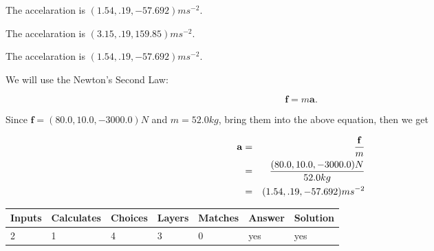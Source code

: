 \documentclass[12pt]{article}
\begin{document}
 
  The accelaration is $  %
(
1.54,
.19,
-57.692)
ms^{-2} $.
 
 
  The accelaration is $  %
(
3.15,
.19,
159.85)
ms^{-2} $.
 
 
\noindent{}
 
 
  The accelaration is $  %
(
1.54,
.19,
-57.692)
ms^{-2} $.
 
 
\noindent{}
 
 
 
 
 
\noindent{}
 
 

We will use the Newton's Second Law:
 
\[
\mathbf{f}=m\mathbf{a}.
\]
 
Since $\mathbf{f}= %
(80.0 , 10.0 , -3000.0) N$
and $m= %
52.0kg$, bring them into the above equation, then we get
 
\begin{eqnarray*}
\mathbf{a}&=&\frac{\mathbf{f}}m  \\
&=&\frac{ %
(80.0 , 10.0 , -3000.0) N}{ %
52.0kg}  \\
&=& %
(1.54 , .19 , -57.692) ms^{-2}
\end{eqnarray*}
 
 
 
\noindent{}
 
 

 
 
\vspace{0.3in}
   
   
   
   
\noindent\begin{tabular}{|l|l|l|l|l|l|l|}
 \hline
Inputs & Calculates & Choices & Layers & Matches & Answer & Solution \\ \hline
           2 & 
           1 & 
           4
  & 
           3 & 
           0 & 
  yes & 
  yes 
  \\ \hline
 \end{tabular}
   
   
   
\end{document}
